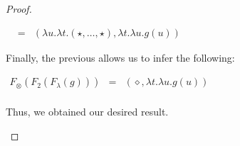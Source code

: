 \begin{proof}
\begin{report}
\begin{center}
\begin{itemize}
\begin{center}
\begin{math}
\begin{array}{lll}
            & = & (\lambda u.\lambda t.(\star,\ldots,\star), \lambda t.\lambda u.g(u))
          \end{array}
        \end{math}
      \end{center}
      Finally, the previous allows us to infer the following:
      \begin{center}
        \begin{math}
          \begin{array}{lll}
            F_\otimes(F_2(F_\lambda(g)))
            & = & (\diamond, \lambda t.\lambda u.g(u))\\
          \end{array}
        \end{math}
      \end{center}
      Thus, we obtained our desired result.


\end{itemize}
\end{center}
\end{report}
\end{proof}
